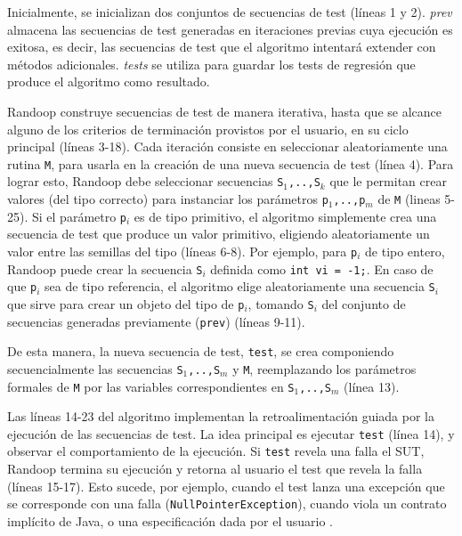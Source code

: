 Inicialmente, se inicializan dos conjuntos de secuencias de test (líneas 1 y 2). 
\emph{prev} almacena las secuencias de test generadas en iteraciones previas cuya
ejecución es exitosa, es decir, las secuencias de test que el algoritmo intentará
extender con métodos adicionales. \emph{tests} se utiliza para guardar los tests
de regresión que produce el algoritmo como resultado.

\textsf{Randoop} construye secuencias de test de manera
iterativa, hasta que se alcance alguno de los criterios de terminación
provistos por el usuario, en su ciclo principal (líneas 3-18). 
Cada iteración consiste en seleccionar aleatoriamente una rutina \texttt{M},
para usarla en la creación de una nueva secuencia de test (línea 4). 
Para lograr esto, \textsf{Randoop} debe seleccionar secuencias \texttt{S$_1$,..,S$_k$}
que le permitan crear valores (del tipo correcto) para instanciar los parámetros 
\texttt{p$_1$,..,p$_m$} de \texttt{M} (lineas 5-25). 
Si el parámetro \texttt{p$_i$} es de tipo primitivo, el algoritmo simplemente
crea una secuencia de test que produce un valor primitivo, eligiendo
aleatoriamente un valor entre las semillas del tipo (líneas 6-8). 
Por ejemplo, para \texttt{p$_i$} de tipo entero, 
\textsf{Randoop} puede crear la secuencia \texttt{S$_i$} definida como 
\texttt{int vi = -1;}.
En caso de que \texttt{p$_i$} sea de tipo referencia, el algoritmo elige
aleatoriamente una secuencia \texttt{S$_i$} que sirve para crear un objeto del
tipo de \texttt{p$_i$}, tomando \texttt{S$_i$} del conjunto de secuencias generadas 
previamente (\texttt{prev}) (líneas 9-11).

De esta manera, la nueva secuencia de test, \texttt{test}, se crea componiendo
secuencialmente las secuencias \texttt{S$_1$,..,S$_m$} y \texttt{M},
reemplazando los parámetros formales de \texttt{M} por las variables
correspondientes en \texttt{S$_1$,..,S$_m$} (línea 13). 

Las líneas 14-23 del algoritmo implementan la retroalimentación guiada por la ejecución
de las secuencias de test. La idea principal es ejecutar \texttt{test} (línea
14), y observar el comportamiento de la ejecución. Si \texttt{test} revela una
falla el SUT, \textsf{Randoop} termina su ejecución y retorna al usuario el test que
revela la falla (líneas 15-17). Esto sucede, por ejemplo, cuando el test lanza una excepción 
que se corresponde con una falla (\texttt{NullPointerException}), cuando viola un contrato implícito 
de Java, o una especificación dada por el usuario \cite{Pacheco07}.

